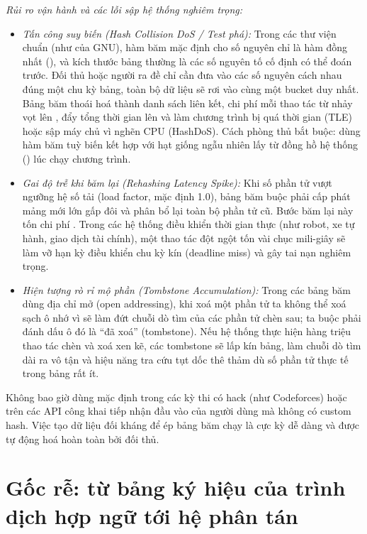 \documentclass[../../algorithm.tex]{subfiles}
\begin{document}
\emph{Rủi ro vận hành và các lỗi sập hệ thống nghiêm trọng:}
\begin{itemize}
\item \emph{Tấn công suy biến (Hash Collision DoS / Test phá):} Trong các thư viện chuẩn (như  của GNU), hàm băm mặc định cho số nguyên chỉ là hàm đồng nhất (), và kích thước bảng thường là các số nguyên tố cố định có thể đoán trước. Đối thủ hoặc người ra đề chỉ cần đưa vào các số nguyên cách nhau đúng một chu kỳ bảng, toàn bộ dữ liệu sẽ rơi vào cùng một bucket duy nhất. Bảng băm thoái hoá thành danh sách liên kết, chi phí mỗi thao tác từ  nhảy vọt lên , đẩy tổng thời gian lên  và làm chương trình bị quá thời gian (TLE) hoặc sập máy chủ vì nghẽn CPU (HashDoS). Cách phòng thủ bắt buộc: dùng hàm băm tuỳ biến kết hợp với hạt giống ngẫu nhiên lấy từ đồng hồ hệ thống () lúc chạy chương trình.
\item \emph{Gai độ trễ khi băm lại (Rehashing Latency Spike):} Khi số phần tử vượt ngưỡng hệ số tải (load factor, mặc định 1.0), bảng băm buộc phải cấp phát mảng mới lớn gấp đôi và phân bổ lại toàn bộ phần tử cũ. Bước băm lại này tốn chi phí . Trong các hệ thống điều khiển thời gian thực (như robot, xe tự hành, giao dịch tài chính), một thao tác đột ngột tốn vài chục mili-giây sẽ làm vỡ hạn kỳ điều khiển chu kỳ kín (deadline miss) và gây tai nạn nghiêm trọng.
\item \emph{Hiện tượng rò rỉ mộ phần (Tombstone Accumulation):} Trong các bảng băm dùng địa chỉ mở (open addressing), khi xoá một phần tử ta không thể xoá sạch ô nhớ vì sẽ làm đứt chuỗi dò tìm của các phần tử chèn sau; ta buộc phải đánh dấu ô đó là ``đã xoá'' (tombstone). Nếu hệ thống thực hiện hàng triệu thao tác chèn và xoá xen kẽ, các tombstone sẽ lấp kín bảng, làm chuỗi dò tìm dài ra vô tận và hiệu năng tra cứu tụt dốc thê thảm dù số phần tử thực tế trong bảng rất ít.
\end{itemize}

\begin{cambay}
Không bao giờ dùng  mặc định trong các kỳ thi có hack (như Codeforces) hoặc trên các API công khai tiếp nhận đầu vào của người dùng mà không có custom hash. Việc tạo dữ liệu đối kháng để ép bảng băm chạy  là cực kỳ dễ dàng và được tự động hoá hoàn toàn bởi đối thủ.
\end{cambay}

\section{Gốc rễ: từ bảng ký hiệu của trình dịch hợp ngữ tới hệ phân tán}
\end{document}
